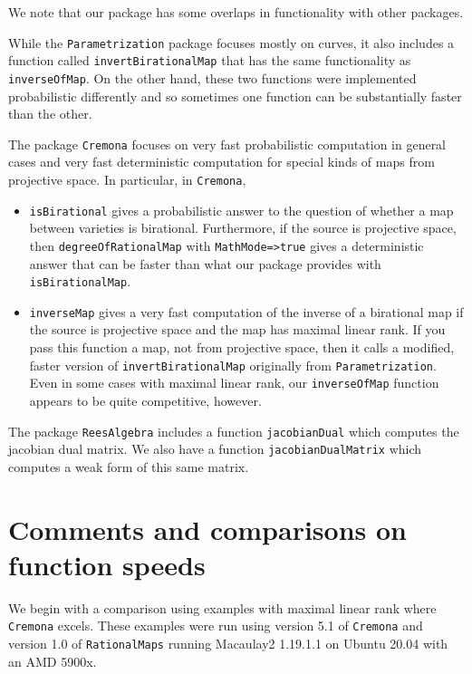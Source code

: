 \documentclass[11pt]{amsart}%
\numberwithin{equation}{theorem}
\renewcommand{\:}{\colon}
\theoremstyle{theorem}
\begin{document}
{{We note that our package has some overlaps in functionality with other packages.

While the {\tt Parametrization} package \cite{ParametrizationPackage} focuses mostly on curves, it also includes a function called {\tt invertBirationalMap} that has the same functionality as {\tt inverseOfMap}. On the other hand, these two functions were implemented probabilistic differently and so sometimes one function can be substantially faster than the other.

The package {\tt Cremona} \cite{CremonaSource,CremonaArticle} focuses on very fast probabilistic computation in general cases and very fast deterministic computation for special kinds of maps from projective space. In particular, in {\tt Cremona},

\begin{itemize}
\item{}     {\tt isBirational} gives a probabilistic answer to the question of whether a map between varieties is birational. Furthermore, if the source is projective space, then {\tt degreeOfRationalMap} with {\tt MathMode=>true}  gives a deterministic answer that can be faster than what our package  provides with {\tt isBirationalMap}.
\item{}  {\tt inverseMap} gives a very fast computation of the inverse of a birational map if the source is projective space and the map has maximal linear rank. If you pass this function a map, not from projective space, then it calls a modified, faster version of {\tt invertBirationalMap} originally from {\tt Parametrization}. Even in some cases with maximal linear rank, our {\tt inverseOfMap} function appears to be quite competitive, however.
\end{itemize}

The package {\tt ReesAlgebra} \cite{ReesAlgebraSource, ReesAlgebraArticle} includes a function {\tt jacobianDual} which computes the jacobian dual matrix.  We also have a function {\tt jacobianDualMatrix} which computes a weak form of this same matrix.

\section{Comments and comparisons on function speeds}
\noindent
We begin with a comparison using examples with maximal linear rank where {\tt Cremona} excels.  These examples were run using version 5.1 of {\tt Cremona} and version 1.0 of {\tt RationalMaps} running Macaulay2 1.19.1.1 on Ubuntu 20.04 with an AMD 5900x.

}}
\end{document}
